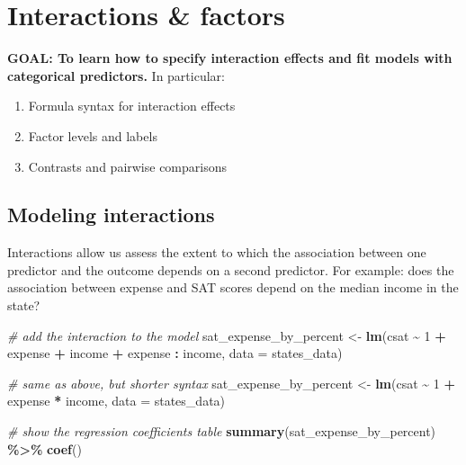\documentclass[
]{book}
\newenvironment{Shaded}{\begin{snugshade}}{\end{snugshade}}
\newcommand{\CommentTok}[1]{\textcolor[rgb]{0.56,0.35,0.01}{\textit{#1}}}
\newcommand{\DataTypeTok}[1]{\textcolor[rgb]{0.13,0.29,0.53}{#1}}
\newcommand{\DecValTok}[1]{\textcolor[rgb]{0.00,0.00,0.81}{#1}}
\newcommand{\KeywordTok}[1]{\textcolor[rgb]{0.13,0.29,0.53}{\textbf{#1}}}
\newcommand{\NormalTok}[1]{#1}
\newcommand{\OperatorTok}[1]{\textcolor[rgb]{0.81,0.36,0.00}{\textbf{#1}}}
\newcommand{\StringTok}[1]{\textcolor[rgb]{0.31,0.60,0.02}{#1}}
\providecommand{\tightlist}{%
  \setlength{\itemsep}{0pt}\setlength{\parskip}{0pt}}
\begin{document}
\hypertarget{interactions-factors}{%
\section{Interactions \& factors}\label{interactions-factors}}

\begin{alert}

\textbf{GOAL: To learn how to specify interaction effects and fit models with categorical predictors.} In particular:

\begin{enumerate}
\def\labelenumi{\arabic{enumi}.}
\tightlist
\item
  Formula syntax for interaction effects
\item
  Factor levels and labels
\item
  Contrasts and pairwise comparisons
\end{enumerate}

\end{alert}

\hypertarget{modeling-interactions}{%
\subsection{Modeling interactions}\label{modeling-interactions}}

Interactions allow us assess the extent to which the association between one predictor and the outcome depends on a second predictor. For example: does the association between expense and SAT scores depend on the median income in the state?

\begin{Shaded}
\begin{Highlighting}[]
  \CommentTok{\# add the interaction to the model}
\NormalTok{  sat\_expense\_by\_percent \textless{}{-}}\StringTok{ }\KeywordTok{lm}\NormalTok{(csat }\OperatorTok{\textasciitilde{}}\StringTok{ }\DecValTok{1} \OperatorTok{+}\StringTok{ }\NormalTok{expense }\OperatorTok{+}\StringTok{ }\NormalTok{income }\OperatorTok{+}\StringTok{ }\NormalTok{expense }\OperatorTok{:}\StringTok{ }\NormalTok{income, }\DataTypeTok{data =}\NormalTok{ states\_data)}

  \CommentTok{\# same as above, but shorter syntax}
\NormalTok{  sat\_expense\_by\_percent \textless{}{-}}\StringTok{ }\KeywordTok{lm}\NormalTok{(csat }\OperatorTok{\textasciitilde{}}\StringTok{ }\DecValTok{1} \OperatorTok{+}\StringTok{ }\NormalTok{expense }\OperatorTok{*}\StringTok{ }\NormalTok{income, }\DataTypeTok{data =}\NormalTok{ states\_data) }

  \CommentTok{\# show the regression coefficients table}
  \KeywordTok{summary}\NormalTok{(sat\_expense\_by\_percent) }\OperatorTok{\%\textgreater{}\%}\StringTok{ }\KeywordTok{coef}\NormalTok{() }
\end{Highlighting}
\end{Shaded}
\end{document}
